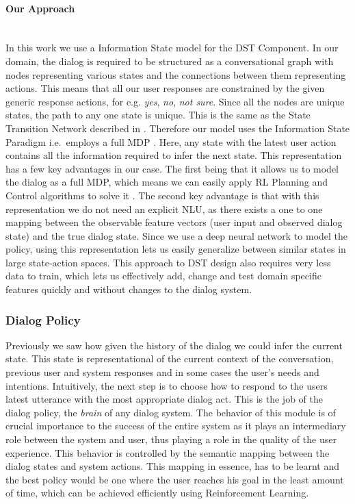 \documentclass[12pt]{extarticle}
\newcommand{\myparagraph}[1]{\paragraph{#1}\mbox{}\\ \linebreak}
\numberwithin{equation}{section}
\begin{document}
	\myparagraph{Our Approach}	
	In this work we use a Information State model for the DST Component. In our domain,  the dialog is required to be structured as a conversational graph with nodes representing various states and the connections between them representing actions. This means that all our user responses are constrained by the given generic response actions,  for e.g. \textit{yes}, \textit{no}, \textit{not sure}. Since all the nodes are unique states, the path to any one state is unique. This is the same as the State Transition Network described in \cite{Sutton-introRL}. Therefore our model uses the Information State Paradigm i.e.\ employs a full MDP \cite{Larsson:2000:ISD:973935.973943}. Here, any state with the latest user action contains all the information required to infer the next state. This representation has a few key advantages in our case. The first being that it allows us to model the dialog as a full MDP, which means we can easily apply RL Planning and Control algorithms to solve it \cite{Sutton-introRL}.  The second key advantage is that with this representation we do not need an explicit NLU, as there exists a one to one mapping between the observable feature vectors (user input and observed dialog state) and the true dialog state. Since we use a deep neural network to model the policy, using this representation lets us easily generalize between similar states in large state-action spaces. This approach to DST design also requires very less data to train, which lets us effectively add, change and test domain specific features quickly and without changes to the dialog system.
	\subsubsection{Dialog Policy} 
	Previously we saw how given the history of the dialog we could infer the current state. This state is representational of the current context of the conversation, previous user and system responses and in some cases the user's needs and intentions. Intuitively, the next step is to choose how to respond to the users latest utterance with the most appropriate dialog act. This is the job of the dialog policy, the \textit{brain} of any dialog system. The behavior of this module is of crucial importance to the success of the entire system as it plays an intermediary role between the system and user, thus playing a role in the quality of the user experience. This behavior is controlled by the semantic mapping between the dialog states and system actions. This mapping in essence, has to be learnt and the best policy would be one where the user reaches his goal in the least amount of time, which can be achieved efficiently using Reinforcement Learning. 
	
\end{document}
